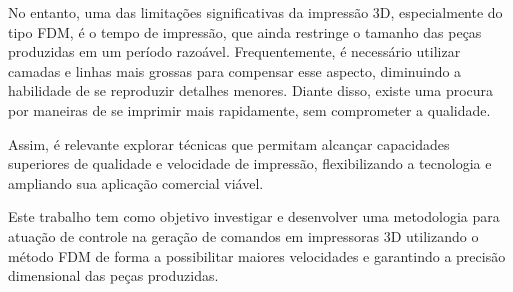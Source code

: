 No entanto, uma das limitações significativas da impressão 3D, especialmente do tipo FDM, é o tempo de
impressão, que ainda restringe o tamanho das peças produzidas em um período razoável. Frequentemente, é
necessário utilizar camadas e linhas mais grossas para compensar esse aspecto, diminuindo a habilidade de
se reproduzir detalhes menores. Diante disso, existe uma procura por maneiras de se imprimir mais rapidamente,
sem comprometer a qualidade.

Assim, é relevante explorar técnicas que permitam alcançar capacidades superiores de qualidade e
velocidade de impressão, flexibilizando a tecnologia e ampliando sua aplicação comercial viável.

Este trabalho tem como objetivo investigar e desenvolver uma metodologia para atuação de controle na geração de
comandos em impressoras 3D utilizando o método FDM de forma a possibilitar maiores velocidades e garantindo a precisão dimensional das peças produzidas.